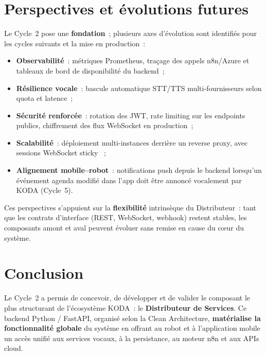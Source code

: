 \documentclass[a4paper,12pt]{report}
\begin{document}
	\section{Perspectives et évolutions futures}
	\label{sec:ch4-perspectives}
	
	Le Cycle~2 pose une \textbf{fondation}~; plusieurs axes d'évolution sont identifiés
	pour les cycles suivants et la mise en production~:
	\begin{itemize}[noitemsep]
		\item \textbf{Observabilité}~: métriques Prometheus, traçage des appels n8n/Azure
		et tableaux de bord de disponibilité du backend~;
		\item \textbf{Résilience vocale}~: bascule automatique STT/TTS multi-fournisseurs
		selon quota et latence~;
		\item \textbf{Sécurité renforcée}~: rotation des JWT, rate limiting sur les
		endpoints publics, chiffrement des flux WebSocket en production~;
		\item \textbf{Scalabilité}~: déploiement multi-instances derrière un reverse
		proxy, avec sessions WebSocket \og sticky \fg{}~;
		\item \textbf{Alignement mobile--robot}~: notifications push depuis le backend
		lorsqu'un événement agenda modifié dans l'app doit être annoncé vocalement par
		KODA (Cycle~5).
	\end{itemize}
	
	Ces perspectives s'appuient sur la \textbf{flexibilité} intrinsèque du Distributeur~:
	tant que les contrats d'interface (REST, WebSocket, webhook) restent stables, les
	composants amont et aval peuvent évoluer sans remise en cause du c\oe{}ur du système.
	
	\section{Conclusion}
	
	Le Cycle~2 a permis de concevoir, de développer et de valider le composant le
	plus structurant de l'écosystème KODA~: le \textbf{Distributeur de Services}. Ce
	backend Python / FastAPI, organisé selon la Clean Architecture, \textbf{matérialise
	la fonctionnalité globale} du système en offrant au robot et à l'application mobile
	un accès unifié aux services vocaux, à la persistance, au moteur n8n et aux APIs
	cloud.
	
\end{document}
